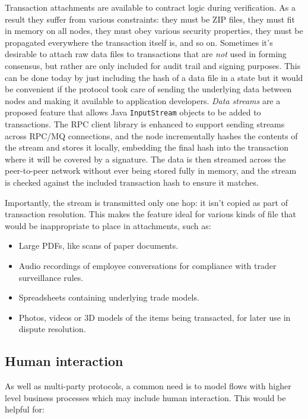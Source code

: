 \documentclass{article}
\begin{document}
Transaction attachments are available to contract logic during verification. As a result they suffer from various
constraints: they must be ZIP files, they must fit in memory on all nodes, they must obey various security
properties, they must be propagated everywhere the transaction itself is, and so on. Sometimes it's desirable to
attach raw data files to transactions that are \emph{not} used in forming consensus, but rather are only included
for audit trail and signing purposes. This can be done today by just including the hash of a data file in a state
but it would be convenient if the protocol took care of sending the underlying data between nodes and making it
available to application developers. \emph{Data streams} are a proposed feature that allows Java
\texttt{InputStream} objects to be added to transactions. The RPC client library is enhanced to support sending
streams across RPC/MQ connections, and the node incrementally hashes the contents of the stream and stores it
locally, embedding the final hash into the transaction where it will be covered by a signature. The data is then
streamed across the peer-to-peer network without ever being stored fully in memory, and the stream is checked
against the included transaction hash to ensure it matches.

Importantly, the stream is transmitted only one hop: it isn't copied as part of transaction resolution. This makes
the feature ideal for various kinds of file that would be inappropriate to place in attachments, such as:

\begin{itemize}
    \item Large PDFs, like scans of paper documents.
    \item Audio recordings of employee conversations for compliance with trader surveillance rules.
    \item Spreadsheets containing underlying trade models.
    \item Photos, videos or 3D models of the items being transacted, for later use in dispute resolution.
\end{itemize}

\subsection{Human interaction}

As well as multi-party protocols, a common need is to model flows with higher level business processes which may
include human interaction. This would be helpful for:
\end{document}

